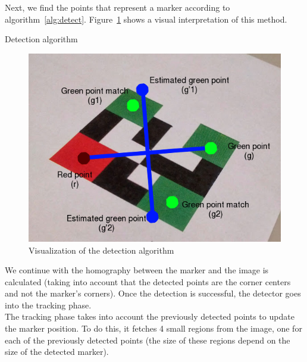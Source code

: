 \documentclass[DIV=calc, paper=a4, fontsize=11pt, twocolumn]{scrartcl}   %
\begin{document}
Next, we find the points that represent a marker according to algorithm~\ref{alg:detect}. Figure~\ref{fig:detect} shows a visual
interpretation of this method.

\begin{algorithm}
\caption{Detection algorithm}
\label{alg:detect}
\end{algorithm}

\begin{figure}[!h]
    \centering
    \includegraphics[width=0.9\columnwidth]{marker.png}
    \caption{Visualization of the detection algorithm}
    \label{fig:detect}
\end{figure}

We continue with the homography between the marker and the image is calculated (taking into account that the detected points are the corner centers and not the marker's corners).
Once the detection is successful, the detector goes into the tracking phase.\\


The tracking phase takes into account the previously detected points to update the marker position. To do this, it fetches 4 small regions from the image, one for each of the previously detected points (the size of these regions depend on the size of the detected marker).\\
\end{document}
